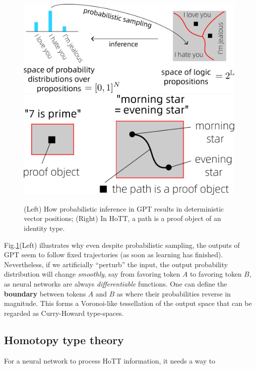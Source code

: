 \documentclass[runningheads]{llncs}
\begin{document}
\begin{figure}
	\includegraphics[scale=.4]{Transformer-output.png} \qquad
	\includegraphics[scale=.35]{morning-star.png}
	\caption{(Left) How probabilistic inference in GPT results in deterministic vector positions; (Right) In HoTT, a path is a proof object of an identity type.}
	\label{fig:morning-star}
\end{figure}

Fig.\ref{fig:morning-star}(Left) illustrates why even despite probabilistic sampling, the outputs of GPT seem to follow fixed trajectories (as soon as learning has finished).  Nevertheless, if we artificially ``perturb'' the input, the output probability distribution will change \textit{smoothly}, say from favoring token $A$ to favoring token $B$, as neural networks are always \textit{differentiable} functions.  One can define the \textbf{boundary} between tokens $A$ and $B$ as where their probabilities reverse in magnitude.  This forms a Voronoi-like tessellation of the output space that can be regarded as Curry-Howard type-spaces.

\subsection{Homotopy type theory}

For a neural network to process HoTT information, it needs a way to 
\end{document}
